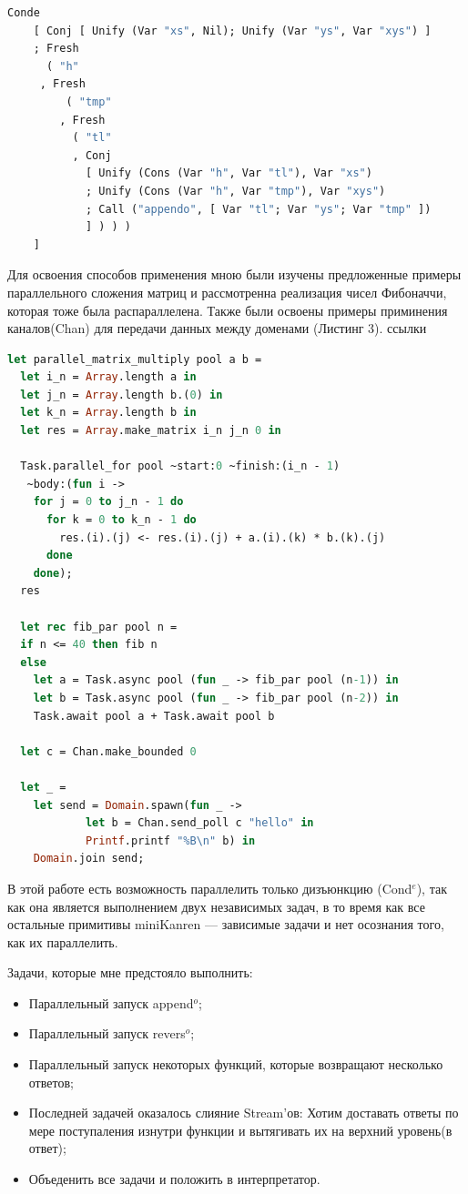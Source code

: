 \begin{lstlisting}[caption=Append$^o$ на синтаксисе Unicanren (конкатенация двух списков), language=OCaml, frame=single]
  Conde
    [ Conj [ Unify (Var "xs", Nil); Unify (Var "ys", Var "xys") ]
    ; Fresh
      ( "h"
     , Fresh
         ( "tmp"
        , Fresh
          ( "tl"
          , Conj
            [ Unify (Cons (Var "h", Var "tl"), Var "xs")
            ; Unify (Cons (Var "h", Var "tmp"), Var "xys")
            ; Call ("appendo", [ Var "tl"; Var "ys"; Var "tmp" ])
            ] ) ) )
    ]
\end{lstlisting}

Для освоения способов применения мною были изучены предложенные примеры параллельного сложения матриц
и рассмотренна реализация чисел Фибоначчи, которая тоже была распараллелена. Также были освоены примеры приминения каналов(Chan) 
для передачи данных между доменами (Листинг 3).
ссылки

\begin{lstlisting}[caption={Применение Domainslib 
  для сложения матриц, 
  чисел Фибоначчи и каналов}, language=OCaml, frame=single]
  let parallel_matrix_multiply pool a b =
  let i_n = Array.length a in
  let j_n = Array.length b.(0) in
  let k_n = Array.length b in
  let res = Array.make_matrix i_n j_n 0 in

  Task.parallel_for pool ~start:0 ~finish:(i_n - 1)
   ~body:(fun i ->
    for j = 0 to j_n - 1 do
      for k = 0 to k_n - 1 do
        res.(i).(j) <- res.(i).(j) + a.(i).(k) * b.(k).(j)
      done
    done);
  res

  let rec fib_par pool n =
  if n <= 40 then fib n
  else
    let a = Task.async pool (fun _ -> fib_par pool (n-1)) in
    let b = Task.async pool (fun _ -> fib_par pool (n-2)) in
    Task.await pool a + Task.await pool b
  
  let c = Chan.make_bounded 0

  let _ =
    let send = Domain.spawn(fun _ ->
            let b = Chan.send_poll c "hello" in
            Printf.printf "%B\n" b) in
    Domain.join send;
\end{lstlisting}

В этой работе есть возможность параллелить только дизъюнкцию (Cond$^e$), так как она является выполнением двух независимых задач,
в то время как все остальные примитивы miniKanren --- зависимые задачи и нет осознания того, как их параллелить.

Задачи, которые мне предстояло выполнить:
\begin{itemize}
  \item Параллельный запуск append$^o$;
\item Параллельный запуск revers$^o$;
\item Параллельный запуск некоторых функций, которые возвращают
несколько ответов;
\item Последней задачей оказалось слияние Stream’ов: Хотим доставать
ответы по мере поступаления изнутри функции и вытягивать их на
верхний уровень(в ответ);
\item Объеденить все задачи и положить в интерпретатор.
\end{itemize}

